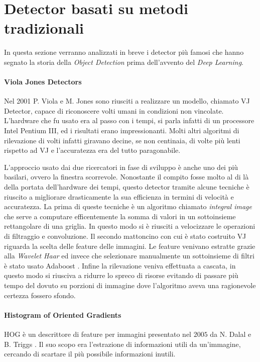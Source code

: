 \section{Detector basati su metodi tradizionali}
\label{sec:traditional_method}
In questa sezione verranno analizzati in breve i detector più famosi che hanno segnato la storia della \textit{Object Detection} prima dell'avvento del \textit{Deep Learning}.
\paragraph{Viola Jones Detectors}
Nel 2001 P. Viola e M. Jones \cite{viola2001rapid, viola2004robust} sono riusciti a realizzare un modello, chiamato \ac{VJ} Detector, capace di riconoscere volti umani in condizioni non vincolate. L'hardware che fu usato era al passo con i tempi, si parla infatti di un processore Intel Pentium III, ed i risultati erano impressionanti. Molti altri algoritmi di rilevazione di volti infatti giravano decine, se non centinaia, di volte più lenti rispetto ad \ac{VJ} e l'accuratezza era del tutto paragonabile. 

L'approccio usato dai due ricercatori in fase di sviluppo è anche uno dei più basilari, ovvero la finestra scorrevole. Nonostante il compito fosse molto al di là della portata dell'hardware dei tempi, questo detector tramite alcune tecniche è riuscito a migliorare drasticamente la sua efficienza in termini di velocità e accuratezza. 
La prima di queste tecniche è un algoritmo chiamato \textit{integral image} che serve a computare efficentemente la somma di valori in un sottoinsieme rettangolare di una griglia. In questo modo si è riusciti a velocizzare le operazioni di filtraggio e convoluzione. 
Il secondo mattoncino con cui è stato costruito \ac{VJ} riguarda la scelta delle feature delle immagini. Le feature venivano estratte grazie alla \textit{Wavelet Haar} ed invece che selezionare manualmente un sottoinsieme di filtri è stato usato Adaboost \cite{freund1999short}. 
Infine la rilevazione veniva effettuata a cascata, in questo modo si riusciva a ridurre lo spreco di risorse evitando di passare più tempo del dovuto su porzioni di immagine dove l'algoritmo aveva una ragionevole certezza fossero sfondo. 
\paragraph{Histogram of Oriented Gradients}
\ac{HOG} è un descrittore di feature per immagini presentato nel $2005$ da N. Dalal e B. Triggs \cite{dalal2005histograms}. Il suo scopo era l'estrazione di informazioni utili da un'immagine, cercando di scartare il più possibile informazioni inutili. 

